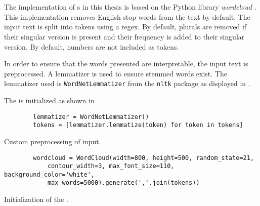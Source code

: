 \section{\wordcloud{}}\label{sec:impl-wordcloud}

The implementation of \wordcloud{}s in this thesis is based on the Python library \textit{wordcloud} \cite{wordcloud-dev}.
This implementation removes English stop words from the text by default.
The input text is split into tokens using a regex.
By default, plurals are removed if their singular version is present and their frequency is added to their singular version.
By default, numbers are not included as tokens.

In order to ensure that the words presented are interpretable, the input text is preprocessed.
A lemmatizer is used to ensure stemmed words exist.
The lemmatizer used is \texttt{WordNetLemmatizer} from the \texttt{nltk} package as displayed in .

The \wordcloud{} is initialized as shown in .

\begin{listing}[htp]
    \begin{verbatim}
        lemmatizer = WordNetLemmatizer()
        tokens = [lemmatizer.lemmatize(token) for token in tokens]
    \end{verbatim}
    \caption{Custom preprocessing of \wordcloud{} input.
    }
    \label{lst:impl-preproc-wordcloud}
\end{listing}

\begin{listing}[htp]
    \begin{verbatim}
        wordcloud = WordCloud(width=800, height=500, random_state=21, 
            contour_width=3, max_font_size=110, background_color='white', 
            max_words=5000).generate(','.join(tokens))
    \end{verbatim}
    \caption{Initialization of the \wordcloud{}.
    }
    \label{lst:impl-wordcloud}
\end{listing}

